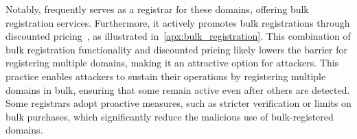 
Notably,  \cite{AlibabaC38:online} frequently serves as a registrar for these domains, offering bulk registration services\cite{DomainNa2:online}. 
Furthermore, it actively promotes bulk registrations through discounted pricing~\cite{NewUserD82:online}, as illustrated in~\autoref{apx:bulk_registration}.%
This combination of bulk registration functionality and discounted pricing likely lowers the barrier for registering multiple domains, making it an attractive option for attackers.
This practice enables attackers to sustain their operations by registering multiple domains in bulk, ensuring that some remain active even after others are detected. 
Some registrars adopt proactive measures, such as stricter verification or limits on bulk purchases, which significantly reduce the malicious use of bulk-registered domains.


